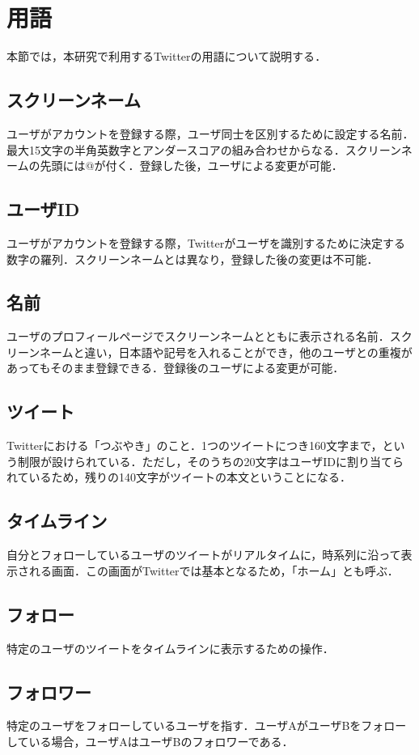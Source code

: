 \section{用語}
本節では，本研究で利用するTwitterの用語について説明する\cite{twitterwords}．

\subsection{スクリーンネーム}
ユーザがアカウントを登録する際，ユーザ同士を区別するために設定する名前．最大15文字の半角英数字とアンダースコアの組み合わせからなる．スクリーンネームの先頭には@が付く．登録した後，ユーザによる変更が可能．

\subsection{ユーザID}
ユーザがアカウントを登録する際，Twitterがユーザを識別するために決定する数字の羅列．スクリーンネームとは異なり，登録した後の変更は不可能．

\subsection{名前}
ユーザのプロフィールページでスクリーンネームとともに表示される名前．スクリーンネームと違い，日本語や記号を入れることができ，他のユーザとの重複があってもそのまま登録できる．登録後のユーザによる変更が可能．

\subsection{ツイート}
Twitterにおける「つぶやき」のこと．1つのツイートにつき160文字まで，という制限が設けられている．ただし，そのうちの20文字はユーザIDに割り当てられているため，残りの140文字がツイートの本文ということになる．

\subsection{タイムライン}
自分とフォローしているユーザのツイートがリアルタイムに，時系列に沿って表示される画面．この画面がTwitterでは基本となるため，「ホーム」とも呼ぶ．

\subsection{フォロー}
特定のユーザのツイートをタイムラインに表示するための操作．

\subsection{フォロワー}
特定のユーザをフォローしているユーザを指す．ユーザAがユーザBをフォローしている場合，ユーザAはユーザBのフォロワーである．

